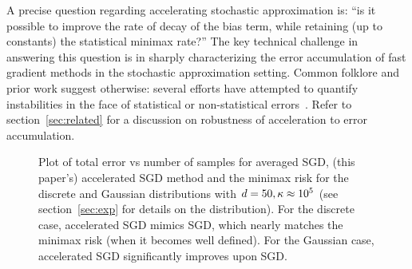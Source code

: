 A precise question regarding accelerating stochastic
approximation is: ``is it possible to improve the rate of decay of the
bias term, while retaining (up to constants) the statistical minimax
rate?'' The key technical challenge in answering this question is in
sharply characterizing the error accumulation of fast gradient methods
in the stochastic approximation setting. Common folklore and prior
work suggest otherwise: several efforts have attempted to 
quantify instabilities in the face of statistical or
non-statistical
errors~\citep{Paige71,Proakis74,Polyak87,Greenbaum89,RoyS90,SharmaSB98,dAspremont08,DevolderGN13,DevolderGN14,YuanYS16}.
Refer to section~\ref{sec:related} for a discussion on robustness of acceleration to error accumulation.
\begin{figure}[t]
\centering
	\vspace*{-2mm}
	\caption{Plot of total error vs number of samples for averaged
          SGD, (this paper's) accelerated SGD method and the minimax risk for the discrete and Gaussian distributions with $d=50,{\kappa}\approx 10^5$ (see section~\ref{sec:exp} for
          details on the distribution). For the discrete case,
          accelerated SGD mimics SGD, which nearly matches the
          minimax risk (when it becomes well defined). For the
          Gaussian case, accelerated SGD significantly improves upon
          SGD. }\vspace*{-0.8cm}\label{fig:res}
\end{figure}
